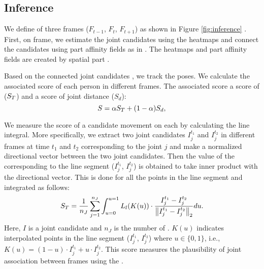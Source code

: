 \documentclass[conference]{IEEEtran}
\begin{document}
\subsection{Inference}
\label{sec:inference}



We define  of three frames ($F_{t-1}$, $F_{t}$, $F_{t+1}$) as shown in Figure \ref{fig:inference} . First, on  frame, we estimate the joint candidates using the  heatmaps and  connect the candidates using part affinity fields as in \cite{cao2017realtime}. The heatmaps and part affinity fields are created by  spatial part .

Based on the connected joint candidates , we track the poses. 
We calculate the associated score of each person in different frames. The associated score   a score of 
(\(S_{\textcolor{black}{T}}\)) and a score of joint distance (\(S_{d}\)): 
\begin{equation}
S = \alpha S_{\textcolor{black}{T}}+(1-\alpha) S_{d},
\label{equ:score}
\end{equation}

We measure the score of a candidate movement on each 
by calculating the line integral. More specifically, we extract two joint candidates $I_j^{t_1}$ and  $I_j^{t_2}$ in different frames at time $t_1$ and $t_2$ corresponding to the joint $j$ and make a normalized directional vector between the two joint candidates. Then the value of the 
corresponding to the line segment ($I_j^{t_1}$, $I_j^{t_2}$) is obtained to take inner product with the directional vector. This is done for all the points in the line segment and integrated as follows:
\begin{equation}
    S_{\textcolor{black}{T}} = \frac{1}{n_J}\sum_{j=1}^{n_J}\int_{u=0}^{u=1}L_{l}(K(u))\cdot \frac{I_{j}^{t_1}-I_{j}^{t_2}}{\left \| I_{j}^{t_1}-I_{j}^{t_2} \right \|_{2}} du.
\end{equation}
Here, $I$ is a joint candidate and $n_J$ is the number of . $K(u)$ indicates interpolated points in the line segment ($I_j^{t_1}$, $I_j^{t_2}$) where $u \in \{0,1\}$, i.e., $K(u)=(1-u)\cdot I_j^{t_1}+u\cdot I_j^{t_2}$.
This score measures the plausibility of joint association between frames using the . 
\end{document}
